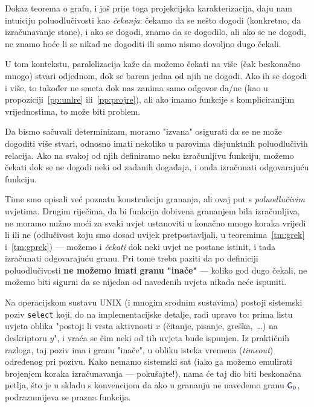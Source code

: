 
Dokaz teorema o grafu, i još prije toga projekcijska karakterizacija, daju nam intuiciju poluodlučivosti kao \emph{čekanja}: čekamo da se nešto dogodi (konkretno, da izračunavanje stane), i ako se dogodi, znamo da se dogodilo, ali ako se ne dogodi, ne znamo hoće li se nikad ne dogoditi ili samo nismo dovoljno dugo čekali.

U tom kontekstu, paralelizacija kaže da možemo čekati na više (čak beskonačno mnogo) stvari odjednom, dok se barem jedna od njih ne dogodi. Ako ih se dogodi i više, to također ne smeta dok nas zanima samo odgovor da\slash ne (kao u propoziciji~\ref{pp:unlre} ili~\ref{pp:projre}), ali ako imamo funkcije s kompliciranijim vrijednostima, to može biti problem.%

Da bismo sačuvali determinizam, moramo "izvana" osigurati da se ne može dogoditi više stvari, odnosno imati nekoliko u parovima disjunktnih poluodlučivih relacija. Ako na svakoj od njih definiramo neku izračunljivu funkciju, možemo čekati dok se ne dogodi neki od zadanih događaja, i onda izračunati odgovarajuću funkciju.

Time smo opisali već poznatu konstrukciju grananja, ali ovaj put s \emph{poluodlučivim} uvjetima. Drugim riječima, da bi funkcija dobivena grananjem bila izračunljiva, ne moramo nužno moći za svaki uvjet ustanoviti u konačno mnogo koraka vrijedi li ili ne (odlučivost koju smo dosad uvijek pretpostavljali, u teoremima~\ref{tm:grek} i~\ref{tm:gprek}) --- možemo i \emph{čekati} dok neki uvjet ne postane istinit, i tada izračunati odgovarajuću granu. Pri tome treba paziti da po definiciji poluodlučivosti \textbf{ne možemo imati granu "inače"} --- koliko god dugo čekali, ne možemo biti sigurni da se nijedan od navedenih uvjeta nikada neće ispuniti.

Na operacijskom sustavu UNIX (i mnogim srodnim sustavima) postoji sistemski poziv \texttt{select} koji, do na implementacijske detalje, radi upravo to: prima listu uvjeta oblika "postoji li vrsta aktivnosti $x$ (čitanje, pisanje, greška,~\ldots) na deskriptoru $y$", i vraća se čim neki od tih uvjeta bude ispunjen. Iz praktičnih razloga, taj poziv ima i granu "inače", u obliku isteka vremena (\emph{timeout}) određenog pri pozivu. Kako nemamo sistemski sat (iako ga možemo emulirati brojenjem koraka izračunavanja --- pokušajte!), nama će taj dio biti beskonačna petlja, što je u skladu s konvencijom da ako u grananju ne navedemo granu $\f G_0$, podrazumijeva se prazna funkcija.


